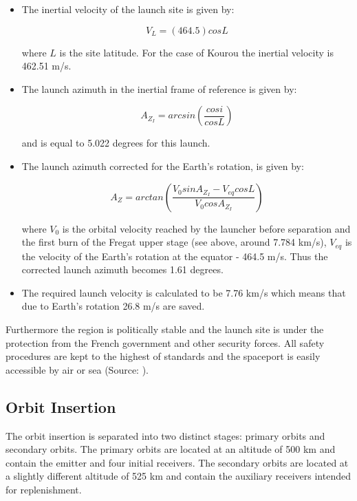 \begin{itemize}
	\item The inertial velocity of the launch site is given by:
	
	\begin{equation} 
 		V_L = (464.5) cos L 
	\end{equation}
	
	where $L$ is the site latitude. For the case of Kourou the inertial velocity is 462.51 m/s.
	\item The launch azimuth in the inertial frame of reference is given by:
	
	\begin{equation} 
 		A_{Z_I} = arcsin(\frac{cos i}{cos L})
	\end{equation}
	
	and is equal to 5.022 degrees for this launch.
	\item The launch azimuth corrected for the Earth's rotation, is given by:
	
	\begin{equation} 
 		A_Z = arctan(\frac{V_0sinA_{Z_I}-V_{eq}cosL}{V_0cosA_{Z_I}})
	\end{equation}
	
	where $V_0$ is the orbital velocity reached by the launcher before separation and the first burn of the Fregat upper stage (see above, around 7.784 km/s), $V_{eq}$ is the velocity of the Earth's rotation at the equator - 464.5 m/s. Thus the corrected launch azimuth becomes 1.61 degrees. 
	
	\item The required launch velocity is calculated to be 7.76 km/s which means that due to Earth's rotation 26.8 m/s are saved.
\end{itemize}

Furthermore the region is politically stable and the launch site is under the protection from the French government and other security forces. All safety procedures are kept to the highest of standards and the spaceport is easily accessible by air or sea (Source: \cite{soyuzman}).

\subsection{Orbit Insertion}
\label{frLSOI}

The orbit insertion is separated into two distinct stages: primary orbits and secondary orbits. The primary orbits are located at an altitude of 500 km and contain the emitter and four initial receivers. The secondary orbits are located at a slightly different altitude of 525 km and contain the auxiliary receivers intended for replenishment.

